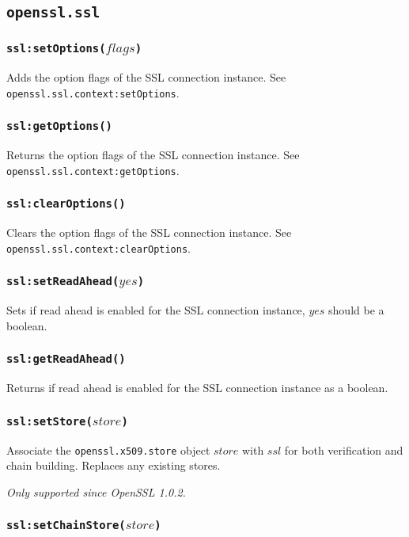 \documentclass[11pt, oneside]{memoir}
\newcommand*{\fn}[1]{\texttt{#1}\xspace}
\newcommand*{\module}[1]{\texttt{#1}\xspace}
\newcounter{toccols}
\newenvironment{Module}[1]{
	\subsection{\texttt{#1}}
	\addtocontents{toc}{
		\protect\begin{multicols}{\value{toccols}}
	}
}{
	\addtocontents{toc}{\protect\end{multicols}}
}
\begin{document}
\begin{Module}{openssl.ssl}
\subsubsection[\fn{ssl:setOptions}]{\fn{ssl:setOptions($flags$)}}

Adds the option flags of the SSL connection instance. See \fn{openssl.ssl.context:setOptions}.

\subsubsection[\fn{ssl:getOptions}]{\fn{ssl:getOptions()}}

Returns the option flags of the SSL connection instance. See \fn{openssl.ssl.context:getOptions}.

\subsubsection[\fn{ssl:clearOptions}]{\fn{ssl:clearOptions()}}

Clears the option flags of the SSL connection instance. See \fn{openssl.ssl.context:clearOptions}.

\subsubsection[\fn{ssl:setReadAhead}]{\fn{ssl:setReadAhead($yes$)}}

Sets if read ahead is enabled for the SSL connection instance, $yes$ should be a boolean.

\subsubsection[\fn{ssl:getReadAhead}]{\fn{ssl:getReadAhead()}}

Returns if read ahead is enabled for the SSL connection instance as a boolean.

\subsubsection[\fn{ssl:setStore}]{\fn{ssl:setStore($store$)}}

Associate the \module{openssl.x509.store} object $store$ with $ssl$ for both verification and chain building. Replaces any existing stores.

\emph{Only supported since OpenSSL 1.0.2.}

\subsubsection[\fn{ssl:setChainStore}]{\fn{ssl:setChainStore($store$)}}


\end{Module}
\end{document}
